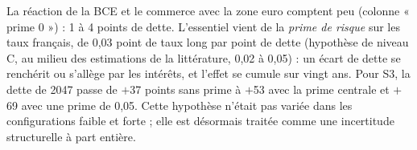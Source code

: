 \par{}\medskip
 La réaction de la BCE et le commerce avec la zone euro comptent peu (colonne « prime 0 ») : 1 à 4 points de dette. L'essentiel vient de la \emph{prime de risque} sur les taux français, de 0,03 point de taux long par point de dette (hypothèse de niveau C, au milieu des estimations de la littérature, 0,02 à 0,05) : un écart de dette se renchérit ou s'allège par les intérêts, et l'effet se cumule sur vingt ans. Pour S3, la dette de 2047 passe de $+$37 points sans prime à $+$53 avec la prime centrale et $+$69 avec une prime de 0,05. Cette hypothèse n'était pas variée dans les configurations faible et forte ; elle est désormais traitée comme une incertitude structurelle à part entière.
